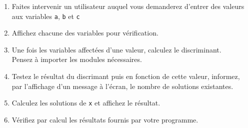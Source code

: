 \begin{enumerate}

\item Faites intervenir un utilisateur auquel vous demanderez  d'entrer des valeurs aux
  variables \texttt{a}, \texttt{b} et \texttt{c}
\item Affichez chacune des variables pour vérification.
\item Une fois les variables affectées d'une valeur, calculez le discriminant.\\
  Pensez à importer les modules nécessaires.
\item Testez le résultat du discrimant puis en fonction de cette valeur, informez,
  par l'affichage d'un message à l'écran, le nombre de solutions existantes.
\item Calculez les solutions de \texttt{x} et affichez le résultat.
\item Vérifiez par calcul les résultats fournis par votre programme.

\end{enumerate}
